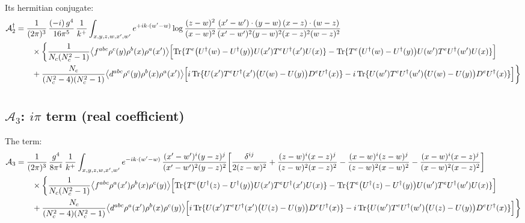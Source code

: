 \documentclass[10pt]{article}
\begin{document}
\noindent Its hermitian conjugate:
\begin{align}
\mathcal{A}_{2}^{\dagger}&=\frac{1}{(2\pi)^{3}}\,\frac{(-i)\,g^{4}}{16\pi^{5}}\,\frac{1}{k^{+}}\int_{x,y,z,w,x',w'}e^{+ik\cdot(w'-w)}\log\frac{(z-w)^{2}}{(x-w)^{2}}\frac{(x'-w')\cdot(y-w)\,(x-z)\cdot(w-z)}{(x'-w')^{2}(y-w)^{2}(x-z)^{2}(w-z)^{2}}\notag\\
&\qquad\times\bigg\{\frac{1}{N_{c}(N_{c}^{2}-1)}\big\langle f^{abc}\rho^{c}(y)\rho^{b}(x)\rho^{a}(x')\big\rangle\Big[{\rm Tr}\{T^{e}\big(U^{\dagger}(w)-U^{\dagger}(y)\big)U(x')T^{e}U^{\dagger}(x')U(x)\}-{\rm Tr}\{T^{e}\big(U^{\dagger}(w)-U^{\dagger}(y)\big)U(w')T^{e}U^{\dagger}(w')U(x)\}\Big]\notag\\&\qquad+\frac{N_{c}}{(N_{c}^{2}-4)(N_{c}^{2}-1)}\big\langle d^{abc}\rho^{c}(y)\rho^{b}(x)\rho^{a}(x')\big\rangle\Big[i\,{\rm Tr}\{U(x')T^{e}U^{\dagger}(x')\big(U(w)-U(y)\big)D^{e}U^{\dagger}(x)\}-i\,{\rm Tr}\{U(w')T^{e}U^{\dagger}(w')\big(U(w)-U(y)\big)D^{e}U^{\dagger}(x)\}\Big]\bigg\}\notag\\[6pt]
\end{align}

\subsection*{$\mathcal{A}_{3}$: $i\pi$ term (real coefficient)}
\noindent The term:
\begin{align}
\mathcal{A}_{3}&=\frac{1}{(2\pi)^{3}}\,\frac{g^{4}}{8\pi^{4}}\,\frac{1}{k^{+}}\int_{x,y,z,w,x',w'}e^{-ik\cdot(w'-w)}\,\frac{(x'-w')^{i}(y-z)^{j}}{(x'-w')^{2}(y-z)^{2}}\bigg[\frac{\delta^{ij}}{2(z-w)^{2}}+\frac{(z-w)^{i}(x-z)^{j}}{(z-w)^{2}(x-z)^{2}}-\frac{(x-w)^{i}(z-w)^{j}}{(z-w)^{2}(x-w)^{2}}-\frac{(x-w)^{i}(x-z)^{j}}{(x-w)^{2}(x-z)^{2}}\bigg]\notag\\
&\qquad\times\bigg\{\frac{1}{N_{c}(N_{c}^{2}-1)}\big\langle f^{abc}\rho^{a}(x')\rho^{b}(x)\rho^{c}(y)\big\rangle\Big[{\rm Tr}\{T^{e}\big(U^{\dagger}(z)-U^{\dagger}(y)\big)U(x')T^{e}U^{\dagger}(x')U(x)\}-{\rm Tr}\{T^{e}\big(U^{\dagger}(z)-U^{\dagger}(y)\big)U(w')T^{e}U^{\dagger}(w')U(x)\}\Big]\notag\\&\qquad+\frac{N_{c}}{(N_{c}^{2}-4)(N_{c}^{2}-1)}\big\langle d^{abc}\rho^{a}(x')\rho^{b}(x)\rho^{c}(y)\big\rangle\Big[i\,{\rm Tr}\{U(x')T^{e}U^{\dagger}(x')\big(U(z)-U(y)\big)D^{e}U^{\dagger}(x)\}-i\,{\rm Tr}\{U(w')T^{e}U^{\dagger}(w')\big(U(z)-U(y)\big)D^{e}U^{\dagger}(x)\}\Big]\bigg\}\notag\\[6pt]
\end{align}
\end{document}
